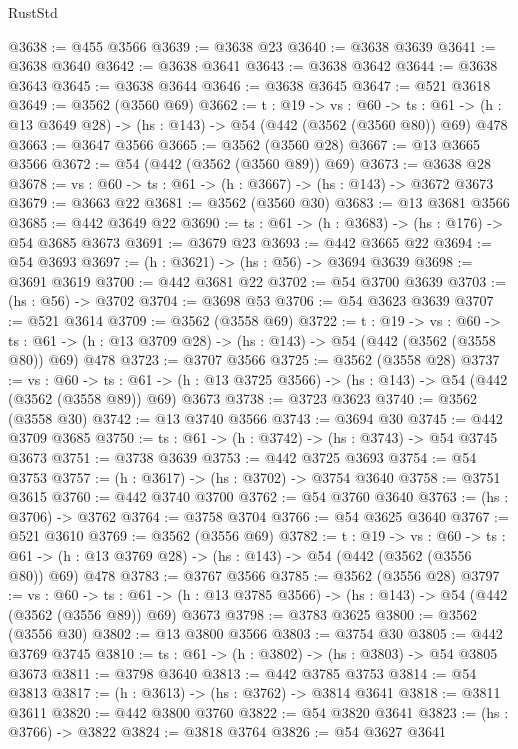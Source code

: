 \begin{lexlean}{RustStd}
\begin{coremodule}
@3638 := @455 @3566
@3639 := @3638 @23
@3640 := @3638 @3639
@3641 := @3638 @3640
@3642 := @3638 @3641
@3643 := @3638 @3642
@3644 := @3638 @3643
@3645 := @3638 @3644
@3646 := @3638 @3645
@3647 := @521 @3618
@3649 := @3562 (@3560 @69)
@3662 := {t : @19} ->
  {vs : @60} ->
  {ts : @61} -> (h : @13 @3649 @28) -> (hs : @143) -> @54 (@442 (@3562 (@3560 @80)) @69) @478
@3663 := @3647 @3566
@3665 := @3562 (@3560 @28)
@3667 := @13 @3665 @3566
@3672 := @54 (@442 (@3562 (@3560 @89)) @69)
@3673 := @3638 @28
@3678 := {vs : @60} -> {ts : @61} -> (h : @3667) -> (hs : @143) -> @3672 @3673
@3679 := @3663 @22
@3681 := @3562 (@3560 @30)
@3683 := @13 @3681 @3566
@3685 := @442 @3649 @22
@3690 := {ts : @61} -> (h : @3683) -> (hs : @176) -> @54 @3685 @3673
@3691 := @3679 @23
@3693 := @442 @3665 @22
@3694 := @54 @3693
@3697 := (h : @3621) -> (hs : @56) -> @3694 @3639
@3698 := @3691 @3619
@3700 := @442 @3681 @22
@3702 := @54 @3700 @3639
@3703 := (hs : @56) -> @3702
@3704 := @3698 @53
@3706 := @54 @3623 @3639
@3707 := @521 @3614
@3709 := @3562 (@3558 @69)
@3722 := {t : @19} ->
  {vs : @60} ->
  {ts : @61} -> (h : @13 @3709 @28) -> (hs : @143) -> @54 (@442 (@3562 (@3558 @80)) @69) @478
@3723 := @3707 @3566
@3725 := @3562 (@3558 @28)
@3737 := {vs : @60} ->
  {ts : @61} -> (h : @13 @3725 @3566) -> (hs : @143) -> @54 (@442 (@3562 (@3558 @89)) @69) @3673
@3738 := @3723 @3623
@3740 := @3562 (@3558 @30)
@3742 := @13 @3740 @3566
@3743 := @3694 @30
@3745 := @442 @3709 @3685
@3750 := {ts : @61} -> (h : @3742) -> (hs : @3743) -> @54 @3745 @3673
@3751 := @3738 @3639
@3753 := @442 @3725 @3693
@3754 := @54 @3753
@3757 := (h : @3617) -> (hs : @3702) -> @3754 @3640
@3758 := @3751 @3615
@3760 := @442 @3740 @3700
@3762 := @54 @3760 @3640
@3763 := (hs : @3706) -> @3762
@3764 := @3758 @3704
@3766 := @54 @3625 @3640
@3767 := @521 @3610
@3769 := @3562 (@3556 @69)
@3782 := {t : @19} ->
  {vs : @60} ->
  {ts : @61} -> (h : @13 @3769 @28) -> (hs : @143) -> @54 (@442 (@3562 (@3556 @80)) @69) @478
@3783 := @3767 @3566
@3785 := @3562 (@3556 @28)
@3797 := {vs : @60} ->
  {ts : @61} -> (h : @13 @3785 @3566) -> (hs : @143) -> @54 (@442 (@3562 (@3556 @89)) @69) @3673
@3798 := @3783 @3625
@3800 := @3562 (@3556 @30)
@3802 := @13 @3800 @3566
@3803 := @3754 @30
@3805 := @442 @3769 @3745
@3810 := {ts : @61} -> (h : @3802) -> (hs : @3803) -> @54 @3805 @3673
@3811 := @3798 @3640
@3813 := @442 @3785 @3753
@3814 := @54 @3813
@3817 := (h : @3613) -> (hs : @3762) -> @3814 @3641
@3818 := @3811 @3611
@3820 := @442 @3800 @3760
@3822 := @54 @3820 @3641
@3823 := (hs : @3766) -> @3822
@3824 := @3818 @3764
@3826 := @54 @3627 @3641

\end{coremodule}
\end{lexlean}
